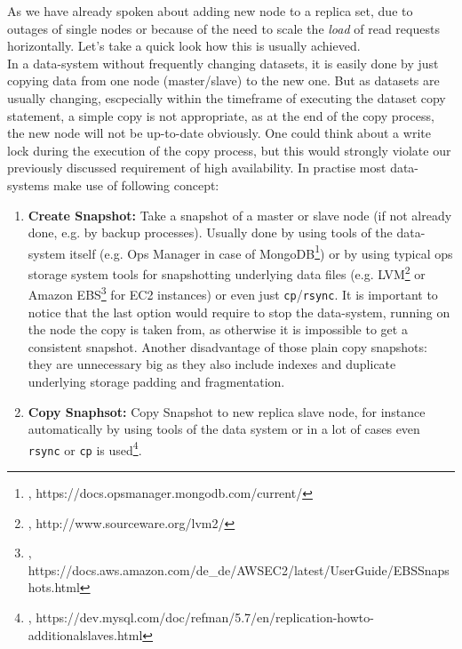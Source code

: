 {
As we have already spoken about adding new node to a replica set, due to outages of single nodes or because of the need to scale the \textit{load} of read requests horizontally. Let's take a quick look how this is usually achieved.\\
In a data-system without frequently changing datasets, it is easily done by just copying data from one node (master/slave) to the new one. But as datasets are usually changing, escpecially within the timeframe of executing the dataset copy statement, a simple copy is not appropriate, as at the end of the copy process, the new node will not be up-to-date obviously. One could think about a write lock during the execution of the copy process, but this would strongly violate our previously discussed requirement of high availability. In practise most data-systems make use of following concept:\\
\begin{enumerate}
\item \textbf{Create Snapshot:} Take a snapshot of a master or slave node (if not already done, e.g. by backup processes). Usually done by using tools of the data-system itself (e.g. Ops Manager in case of MongoDB\footnote{\cite{MDBOM}, https://docs.opsmanager.mongodb.com/current/}) or by using typical ops storage system tools for snapshotting underlying data files (e.g. LVM\footnote{\cite{LVM}, http://www.sourceware.org/lvm2/} or Amazon EBS\footnote{\cite{AMZEBS}, https://docs.aws.amazon.com/de\_de/AWSEC2/latest/UserGuide/EBSSnapshots.html} for EC2 instances) or even just \lstinline{cp}/\lstinline{rsync}. It is important to notice that the last option would require to stop the data-system, running on the node the copy is taken from, as otherwise it is impossible to get a consistent snapshot. Another disadvantage of those plain copy snapshots: they are unnecessary big as they also include indexes and duplicate underlying storage padding and fragmentation.
\item \textbf{Copy Snaphsot:} Copy Snapshot to new replica slave node, for instance automatically by using tools of the data system or in a lot of cases even \lstinline{rsync} or \lstinline{cp} is used\footnote{\cite{MYSQLNS}, https://dev.mysql.com/doc/refman/5.7/en/replication-howto-additionalslaves.html}.

\end{enumerate}}
